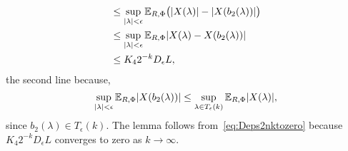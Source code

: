 \documentclass[journal]{IEEEtran}
\begin{document}
\begin{IEEEproof}
\begin{align}
&\leq \sup_{{\vert \lambda \vert} < \epsilon} {\mathbb E}_{R,\Phi} \big( {\vert X(\lambda) \vert} - {\vert X(b_2(\lambda)) \vert} \big) \nonumber \\
&\leq \sup_{{\vert \lambda \vert} < \epsilon} {\mathbb E}_{R,\Phi} {\vert X(\lambda) - X(b_2(\lambda)) \vert} \nonumber \\
&\leq K_4 2^{-k} D_\epsilon L, \label{eq:Deps2nktozero}
\end{align}
the second line because,
\[
\sup_{{\vert \lambda \vert} < \epsilon} {\mathbb E}_{R,\Phi} {\vert X(b_2(\lambda)) \vert} \leq \sup_{\lambda \in T_\epsilon(k)} {\mathbb E}_{R,\Phi} {\vert X(\lambda) \vert},
\]
since $b_2(\lambda) \in T_\epsilon(k)$.  The lemma follows from~\eqref{eq:Deps2nktozero} because $K_4 2^{-k} D_\epsilon L$ converges to zero as $k\rightarrow\infty$.
\end{IEEEproof}




\end{document}
